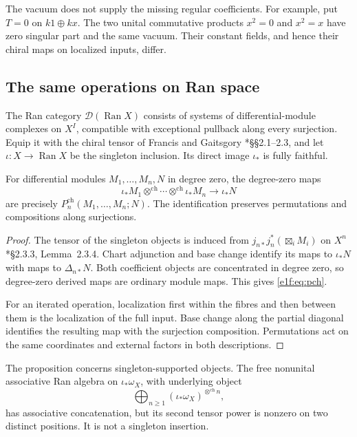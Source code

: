 The vacuum does not supply the missing regular coefficients.
For example, put \(T=0\) on \(k1\oplus kx\). The two unital
commutative products \(x^2=0\) and \(x^2=x\) have zero singular
part and the same vacuum. Their constant fields, and hence their
chiral maps on localized inputs, differ.

\subsection{The same operations on Ran space}

The\label{e1f:def:ran-singleton-system} Ran category \(\mathcal D(\operatorname{Ran}X)\) consists of
systems of differential-module complexes on \(X^I\), compatible
with exceptional pullback along every surjection. Equip it with
the chiral tensor of Francis and Gaitsgory
\cite{chhop:FG}*{\S\S2.1--2.3}, and let
\(\iota:X\to\operatorname{Ran}X\) be the singleton inclusion.
Its direct image \(\iota_*\) is fully faithful.

\begin{proposition}\label{e1c:prop:ran}
For differential modules \(M_1,\ldots,M_n,N\) in degree zero,
the degree-zero maps
\[
 \iota_*M_1\otimes^{\mathrm{ch}}\cdots
       \otimes^{\mathrm{ch}}\iota_*M_n\longrightarrow\iota_*N
\]
are precisely \(P_n^{\mathrm{ch}}(M_1,\ldots,M_n;N)\).
The identification preserves permutations and compositions along
surjections.
\end{proposition}

\begin{proof}
The tensor of the singleton objects is induced from
\(j_{n*}j_n^*(\boxtimes_iM_i)\) on \(X^n\)
\cite{chhop:FG}*{\S2.3.3, Lemma~2.3.4}. Chart adjunction and
base change identify its maps to \(\iota_*N\) with maps to
\(\Delta_{n*}N\). Both coefficient objects are concentrated in
degree zero, so degree-zero derived maps are ordinary module maps.
This gives \eqref{e1f:eq:pch}.

For an iterated operation, localization first within the fibres
and then between them is the localization of the full input.
Base change along the partial diagonal identifies the resulting
map with the surjection composition. Permutations act on the
same coordinates and external factors in both descriptions.
\end{proof}

The proposition concerns singleton-supported objects. The free
nonunital associative Ran algebra on \(\iota_*\omega_X\), with
underlying object
\[
 \bigoplus_{n\geq1}(\iota_*\omega_X)^{\otimes^{\mathrm{ch}}n},
\]
has associative concatenation, but its second tensor power is
nonzero on two distinct positions. It is not a singleton
insertion.

